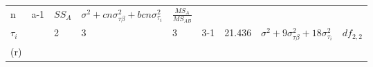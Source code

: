 \documentclass[12pt,]{article}
\begin{document}
\begin{longtable}[]{@{}lllllllll@{}}
\begin{minipage}[t]{0.03\columnwidth}
n\strut
\end{minipage} & \begin{minipage}[t]{0.12\columnwidth}\raggedright
a-1\strut
\end{minipage} & \begin{minipage}[t]{0.15\columnwidth}\raggedright
\(SS_A\)\strut
\end{minipage} & \begin{minipage}[t]{0.21\columnwidth}\raggedright
\(\sigma^2+cn\sigma^2_{\tau\beta}+bcn\sigma^2_{\tau_{i}}\)\strut
\end{minipage} & \begin{minipage}[t]{0.09\columnwidth}\raggedright
\(\frac{MS_{A}}{MS_{AB}}\)\strut
\end{minipage}\tabularnewline
\begin{minipage}[t]{0.06\columnwidth}\raggedright
\(\tau_{i}\)\strut
\end{minipage} & \begin{minipage}[t]{0.03\columnwidth}\raggedright
\strut
\end{minipage} & \begin{minipage}[t]{0.03\columnwidth}\raggedright
2\strut
\end{minipage} & \begin{minipage}[t]{0.03\columnwidth}\raggedright
3\strut
\end{minipage} & \begin{minipage}[t]{0.03\columnwidth}\raggedright
3\strut
\end{minipage} & \begin{minipage}[t]{0.12\columnwidth}\raggedright
3-1\strut
\end{minipage} & \begin{minipage}[t]{0.15\columnwidth}\raggedright
21.436\strut
\end{minipage} & \begin{minipage}[t]{0.21\columnwidth}\raggedright
\(\sigma^2+9\sigma^2_{\tau\beta}+18\sigma^2_{\tau_{i}}\)\strut
\end{minipage} & \begin{minipage}[t]{0.09\columnwidth}\raggedright
\(df_{2,2}\)\strut
\end{minipage}\tabularnewline
\begin{minipage}[t]{0.06\columnwidth}\raggedright
(r)\strut
\end{minipage} & \begin{minipage}[t]{0.03\columnwidth}\raggedright
\strut
\end{minipage} & \begin{minipage}[t]{0.03\columnwidth}\raggedright

\end{minipage}
\end{longtable}
\end{document}

